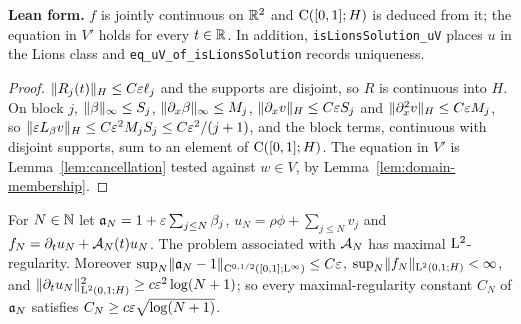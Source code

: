 \textbf{Lean form.}  $f$ is jointly continuous on $\mathbb{R}^2$ and $\mathrm{C}([0,1];H)$ is deduced from it;
the equation in $V'$ holds for every $t\in\mathbb{R}$.  In addition, \texttt{isLionsSolution\_uV} places
$u$ in the Lions class and \texttt{eq\_uV\_of\_isLionsSolution} records uniqueness.

\begin{proof}
  \leanok
  $\lVert R_j(t)\rVert_H\leq C\varepsilon\ell_j$ and the supports are disjoint, so $R$ is continuous into $H$.
  On block $j$, $\lVert \beta\rVert_\infty\leq S_j$, $\lVert \partial_x\beta\rVert_\infty\leq M_j$,
  $\lVert \partial_xv\rVert_H\leq C\varepsilon S_j$ and $\lVert \partial_x^2v\rVert_H\leq C\varepsilon M_j$, so
  $\lVert \varepsilon L_\beta v\rVert_H\leq C\varepsilon^2M_jS_j\leq C\varepsilon^2/(j+1)$, and the block terms, continuous
  with disjoint supports, sum to an element of $\mathrm{C}([0,1];H)$.  The equation in $V'$ is
  Lemma~\ref{lem:cancellation} tested against $w\in V$, by Lemma~\ref{lem:domain-membership}.
\end{proof}

\begin{remark}
  \label{rem:growth}
  \leanok
  For $N\in\mathbb{N}$ let $\mathfrak{a}_N=1+\varepsilon\sum_{j\leq N}\beta_j$, $u_N=\rho\phi+\sum_{j\leq N}v_j$ and
  $f_N=\partial_tu_N+\mathcal{A}_N(t)u_N$.  The problem associated with $\mathcal{A}_N$ has maximal
  $\mathrm{L}^2$-regularity.  Moreover
  $\sup_N\lVert \mathfrak{a}_N-1\rVert_{\mathrm{C}^{0,1/2}([0,1];\mathrm{L}^\infty)}\leq C\varepsilon$,
  $\sup_N\lVert f_N\rVert_{\mathrm{L}^2(0,1;H)}<\infty$, and
  $\lVert \partial_tu_N\rVert^2_{\mathrm{L}^2(0,1;H)}\geq c\varepsilon^2\log(N+1)$; so every maximal-regularity
  constant $C_N$ of $\mathfrak{a}_N$ satisfies $C_N\geq c\varepsilon\sqrt{\log(N+1)}$.
\end{remark}

